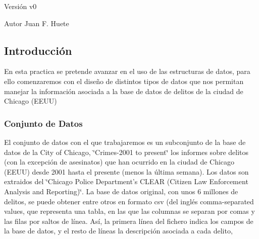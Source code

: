 \begin{DoxyVersion}{Versión}
v0 
\end{DoxyVersion}
\begin{DoxyAuthor}{Autor}
Juan F. Huete
\end{DoxyAuthor}
\hypertarget{index_introsec}{}\subsection{Introducción}\label{index_introsec}
En esta practica se pretende avanzar en el uso de las estructuras de datos, para ello comenzaremos con el diseño de distintos tipos de datos que nos permitan manejar la información asociada a la base de datos de delitos de la ciudad de Chicago (E\+E\+U\+U)\hypertarget{index_baseDatos}{}\subsubsection{Conjunto de Datos}\label{index_baseDatos}
El conjunto de datos con el que trabajaremos es un subconjunto de la base de datos de la City of Chicago, \char`\"{}\+Crimes-\/2001 to present\char`\"{} los informes sobre delitos (con la excepción de asesinatos) que han ocurrido en la ciudad de Chicago (E\+E\+U\+U) desde 2001 hasta el presente (menos la última semana). Los datos son extraidos del \char`\"{}\+Chicago Police Department's C\+L\+E\+A\+R (\+Citizen Law Enforcement Analysis and Reporting)\char`\"{}. La base de datos original, con unos 6 millones de delitos, se puede obtener entre otros en formato csv (del inglés comma-\/separated values, que representa una tabla, en las que las columnas se separan por comas y las filas por saltos de línea. Así, la primera línea del fichero indica los campos de la base de datos, y el resto de líneas la descripción asociada a cada delito,


